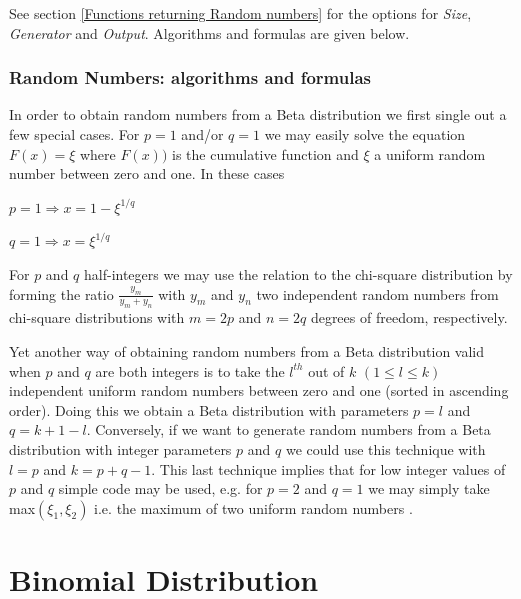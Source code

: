 \vspace{0.3cm}

See section \ref{Functions returning Random numbers} for the options for  {\itshape\sffamily Size},  {\itshape\sffamily Generator} and {\itshape\sffamily Output}. Algorithms and formulas are given below.

\subsubsection{Random Numbers: algorithms and formulas}
\label{BetaDistRandomNumbers}
In order to obtain random numbers from a Beta distribution we first single out a few special cases.
For $p = 1$ and/or $q = 1$ we may easily solve the equation $F(x) = \xi$ where $F(x))$ is the cumulative function and $\xi$ a uniform random number between zero and one. In these cases

\begin{center}
	
	$p = 1 \Rightarrow x = 1 - \xi^{1/q}$
	
	$q = 1 \Rightarrow x = \xi^{1/q}$
	
\end{center}


For $p$ and $q$ half-integers we may use the relation to the chi-square distribution by forming the ratio $\frac{y_m}{y_m + y_n}$ with $y_m$ and $y_n$ two independent random numbers from chi-square distributions with $m =2p$ and $n = 2q$ degrees of freedom, respectively.

Yet another way of obtaining random numbers from a Beta distribution valid when $p$ and $q$ are both integers is to take the $l^{th}$ out of $k$ $(1 \leq l \leq k)$ independent uniform random numbers between zero and one (sorted in ascending order). Doing this we obtain a Beta distribution with parameters $p = l$ and $q = k + 1 - l$. Conversely, if we want to generate random numbers from a Beta distribution with integer parameters $p$ and $q$ we could use this technique with $l = p$ and $k = p+q-1$. This last technique implies that for low integer
values of $p$ and $q$ simple code may be used, e.g. for $p = 2$ and $q = 1$ we may simply take max$(\xi_1, \xi_2)$ i.e. the maximum of two uniform random numbers \citep{walck_2007}.




\newpage
\section{Binomial Distribution}
\label{BinomialDistribution}

